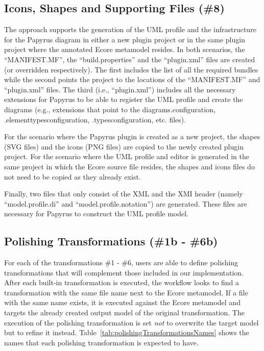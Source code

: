 \subsection{Icons, Shapes and Supporting Files (\#8)}
\label{sec:supportingFiles}
The approach supports the generation of the UML profile and the infrastructure for the Papyrus diagram in either a new plugin project or in the same plugin project where the annotated Ecore metamodel resides. In both scenarios, the ``MANIFEST.MF'', the ``build.properties'' and the ``plugin.xml'' files are created (or overridden respectively). The first includes the list of all the required bundles while the second points the project to the locations of the ``MANIFEST.MF'' and ``plugin.xml'' files. The third (i.e., ``plugin.xml'') includes all the necessary extensions for Papyrus to be able to register the UML profile and create the diagrams (e.g., extensions that point to the diagrams.configuration, .elementtypesconfiguration, .typesconfiguration, etc. files). 

For the scenario where the Papyrus plugin is created as a new project, the 
shapes (SVG files) and the icons (PNG files) are copied to the newly created 
plugin project. For the scenario where the UML profile and editor is generated 
in the same project in which the Ecore source file resides, the shapes and 
icons files do not need to be copied as they already exist.

Finally, two files that only consist of the XML and the XMI header (namely ``model.profile.di'' and ``model.profile.notation'') are generated. These files are necessary for Papyrus to construct the UML profile model.

\subsection{Polishing Transformations (\#1b - \#6b)}
\label{sec:transformationPatches}
For each of the transformations \#1 - \#6, users are able to define polishing transformations that will complement those included in our implementation. After each built-in transformation is executed, the workflow looks to find a transformation with the same file name next to the Ecore metamodel. If a file with the same name exists, it is executed against the Ecore metamodel and targets the already created output model of the original transformation. The execution of the polishing transformation is set \textit{not} to overwrite the target model but to refine it instead. Table~\ref{tab:polishingTransformationsNames} shows the names that each polishing transformation is expected to have.

